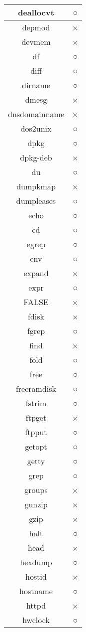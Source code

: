 \begin{longtable}{cc}
deallocvt & ○ \\ \hline
depmod & × \\ \hline
devmem & × \\ \hline
df & ○ \\ \hline
diff & ○ \\ \hline
dirname & ○ \\ \hline
dmesg & × \\ \hline
dnsdomainname & × \\ \hline
dos2unix & ○ \\ \hline
dpkg & ○ \\ \hline
dpkg-deb & × \\ \hline
du & ○ \\ \hline
dumpkmap & × \\ \hline
dumpleases & ○ \\ \hline
echo & ○ \\ \hline
ed & ○ \\ \hline
egrep & ○ \\ \hline
env & ○ \\ \hline
expand & × \\ \hline
expr & ○ \\ \hline
FALSE & × \\ \hline
fdisk & × \\ \hline
fgrep & ○ \\ \hline
find & × \\ \hline
fold & ○ \\ \hline
free & ○ \\ \hline
freeramdisk & ○ \\ \hline
fstrim & ○ \\ \hline
ftpget & × \\ \hline
ftpput & ○ \\ \hline
getopt & ○ \\ \hline
getty & ○ \\ \hline
grep & ○ \\ \hline
groups & × \\ \hline
gunzip & × \\ \hline
gzip & × \\ \hline
halt & ○ \\ \hline
head & × \\ \hline
hexdump & ○ \\ \hline
hostid & × \\ \hline
hostname & ○ \\ \hline
httpd & × \\ \hline
hwclock & ○ \\ \hline

\end{longtable}
